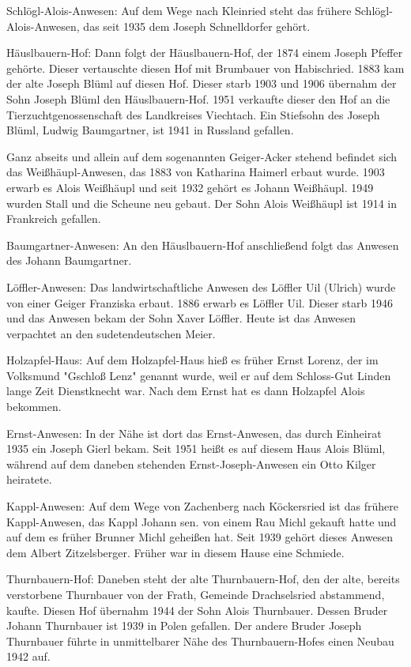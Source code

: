 Schlögl-Alois-Anwesen: Auf dem Wege nach Kleinried steht das frühere
Schlögl-Alois-Anwesen, das seit 1935 dem Joseph Schnelldorfer gehört.

Häuslbauern-Hof: Dann folgt der Häuslbauern-Hof, der 1874 einem Joseph Pfeffer
gehörte. Dieser vertauschte diesen Hof mit Brumbauer von Habischried. 1883 kam
der alte Joseph Blüml auf diesen Hof. Dieser starb 1903 und 1906 übernahm der
Sohn Joseph Blüml den Häuslbauern-Hof. 1951 verkaufte dieser den Hof an die
Tierzuchtgenossenschaft des Landkreises Viechtach. Ein Stiefsohn des Joseph
Blüml, Ludwig Baumgartner, ist 1941 in Russland gefallen.

Ganz abseits und allein auf dem sogenannten Geiger-Acker stehend befindet sich
das Weißhäupl-Anwesen, das 1883 von Katharina Haimerl erbaut wurde. 1903 erwarb
es Alois Weißhäupl und seit 1932 gehört es Johann Weißhäupl. 1949 wurden Stall
und die Scheune neu gebaut. Der Sohn Alois Weißhäupl ist 1914 in Frankreich
gefallen.

Baumgartner-Anwesen: An den Häuslbauern-Hof anschließend folgt das Anwesen des
Johann Baumgartner.

Löffler-Anwesen: Das landwirtschaftliche Anwesen des Löffler Uil (Ulrich) wurde
von einer Geiger Franziska erbaut. 1886 erwarb es Löffler Uil. Dieser starb 1946
und das Anwesen bekam der Sohn Xaver Löffler. Heute ist das Anwesen verpachtet
an den sudetendeutschen Meier.

Holzapfel-Haus: Auf dem Holzapfel-Haus hieß es früher Ernst Lorenz, der im
Volksmund "Gschloß Lenz" genannt wurde, weil er auf dem Schloss-Gut Linden lange
Zeit Dienstknecht war. Nach dem Ernst hat es dann Holzapfel Alois bekommen.

Ernst-Anwesen: In der Nähe ist dort das Ernst-Anwesen, das durch Einheirat 1935
ein Joseph Gierl bekam. Seit 1951 heißt es auf diesem Haus Alois Blüml, während
auf dem daneben stehenden Ernst-Joseph-Anwesen ein Otto Kilger heiratete.

Kappl-Anwesen: Auf dem Wege von Zachenberg nach Köckersried ist das frühere
Kappl-Anwesen, das Kappl Johann sen. von einem Rau Michl gekauft hatte und auf
dem es früher Brunner Michl geheißen hat. Seit 1939 gehört dieses Anwesen dem
Albert Zitzelsberger. Früher war in diesem Hause eine Schmiede.

Thurnbauern-Hof: Daneben steht der alte Thurnbauern-Hof, den der alte, bereits
verstorbene Thurnbauer von der Frath, Gemeinde Drachselsried abstammend, kaufte.
Diesen Hof übernahm 1944 der Sohn Alois Thurnbauer. Dessen Bruder Johann
Thurnbauer ist 1939 in Polen gefallen. Der andere Bruder Joseph Thurnbauer
führte in unmittelbarer Nähe des Thurnbauern-Hofes einen Neubau 1942 auf.

